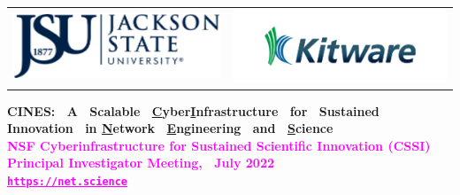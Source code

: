 \documentclass[landscape,paperwidth=70in,paperheight=46in,fontscale=0.225]{baposter} %
\begin{document}
\begin{poster}
{\begin{tabular}{c c}
\includegraphics[scale=0.4]{logos/jsu.png} &
\includegraphics[scale=0.4]{logos/kitware.png} \\
\end{tabular}
}
{\textbf{CINES:~ A~ Scalable~ \underline{C}yber\underline{I}nfrastructure~ 
   for~ Sustained~ Innovation~ in \underline{N}etwork~ \underline{E}ngineering~ and~ \underline{S}cience} \\
\vspace{-3mm}
{
           \textcolor{magenta}{%
               {\textbf{\Large{NSF Cyberinfrastructure for Sustained Scientific Innovation (CSSI) Principal Investigator Meeting,~ July 2022}}}} \\
               \vspace{2.5mm}
                 \textbf{\Large{\textcolor{magenta}{\texttt{\underline{https://net.science}}}}}            
            } }%
            

\end{poster}
\end{document}
